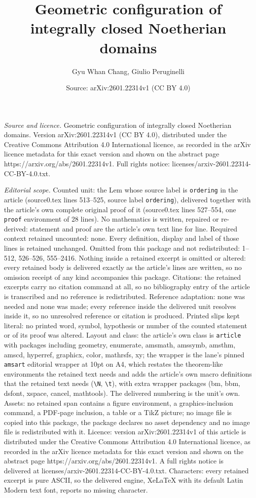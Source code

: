 \documentclass[10pt,a4paper]{amsart}
\title[Geometric configuration of integrally closed Noetherian doma]{Geometric configuration of integrally closed Noetherian domains}
\author{Gyu Whan Chang, Giulio Peruginelli}
\date{Source: arXiv:2601.22314v1 (CC BY 4.0)}
\begin{document}
\maketitle

\noindent\emph{Source and licence.} Geometric configuration of integrally closed Noetherian domains. Version arXiv:2601.22314v1 (CC BY 4.0), distributed under the Creative Commons Attribution 4.0 International licence, as recorded in the arXiv licence metadata for this exact version and shown on the abstract page https://arxiv.org/abs/2601.22314v1. Full rights notice: licenses/arxiv-2601.22314-CC-BY-4.0.txt.\par\smallskip

\noindent\textit{Editorial scope.} Counted unit: the Lem whose source label is \texttt{ordering} in the article (source0.tex lines 513--525, source label \texttt{ordering}), delivered together with the article's own complete original proof of it (source0.tex lines 527--554, one \texttt{proof} environment of 28 lines). No mathematics is written, repaired or re-derived: statement and proof are the article's own text line for line. Required context retained uncounted: none. Every definition, display and label of those lines is retained unchanged. Omitted from this package and not redistributed: 1--512, 526--526, 555--2416. Nothing inside a retained excerpt is omitted or altered: every retained body is delivered exactly as the article's lines are written, so no omission receipt of any kind accompanies this package. Citations: the retained excerpts carry no citation command at all, so no bibliography entry of the article is transcribed and no reference is redistributed. Reference adaptation: none was needed and none was made; every reference inside the delivered unit resolves inside it, so no unresolved reference or citation is produced. Printed slips kept literal: no printed word, symbol, hypothesis or number of the counted statement or of its proof was altered. Layout and class: the article's own class is \texttt{article} with packages including geometry, enumerate, amsmath, amssymb, amsthm, amscd, hyperref, graphicx, color, mathrsfs, xy; the wrapper is the lane's pinned \texttt{amsart} editorial wrapper at 10pt on A4, which restates the theorem-like environments the retained text needs and adds the article's own macro definitions that the retained text needs (\texttt{\textbackslash N}, \texttt{\textbackslash t}), with extra wrapper packages (bm, bbm, dsfont, xspace, cancel, mathtools). The delivered numbering is the unit's own. Assets: no retained span contains a figure environment, a graphics-inclusion command, a PDF-page inclusion, a table or a TikZ picture; no image file is copied into this package, the package declares no asset dependency and no image file is redistributed with it. Licence: version arXiv:2601.22314v1 of this article is distributed under the Creative Commons Attribution 4.0 International licence, as recorded in the arXiv licence metadata for this exact version and shown on the abstract page https://arxiv.org/abs/2601.22314v1. A full rights notice is delivered at licenses/arxiv-2601.22314-CC-BY-4.0.txt. Characters: every retained excerpt is pure ASCII, so the delivered engine, XeLaTeX with its default Latin Modern text font, reports no missing character.
\end{document}
